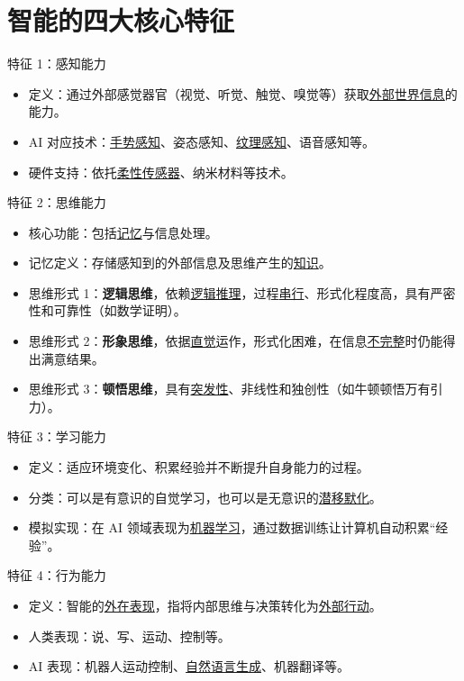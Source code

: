 \documentclass[11pt,a4paper]{ctexrep}
\newcommand{\fillblank}[1]{\underline{\hspace{2em}#1\hspace{2em}}}
\begin{document}
\section{智能的四大核心特征}

\begin{qbox}{特征 1：感知能力}
    \begin{itemize}
        \item 定义：通过外部感觉器官（视觉、听觉、触觉、嗅觉等）获取\fillblank{外部世界信息}的能力。
        \item AI 对应技术：\fillblank{手势感知}、姿态感知、\fillblank{纹理感知}、语音感知等。
        \item 硬件支持：依托\fillblank{柔性传感器}、纳米材料等技术。
    \end{itemize}
\end{qbox}

\begin{qbox}{特征 2：思维能力}
    \begin{itemize}
        \item 核心功能：包括\fillblank{记忆}与信息处理。
        \item 记忆定义：存储感知到的外部信息及思维产生的\fillblank{知识}。
        \item 思维形式 1：\textbf{逻辑思维}，依赖\fillblank{逻辑推理}，过程\fillblank{串行}、形式化程度高，具有严密性和可靠性（如数学证明）。
        \item 思维形式 2：\textbf{形象思维}，依据\fillblank{直觉}运作，形式化困难，在信息\fillblank{不完整}时仍能得出满意结果。
        \item 思维形式 3：\textbf{顿悟思维}，具有\fillblank{突发性}、非线性和独创性（如牛顿顿悟万有引力）。
    \end{itemize}
\end{qbox}

\begin{qbox}{特征 3：学习能力}
    \begin{itemize}
        \item 定义：适应环境变化、积累经验并不断提升自身能力的过程。
        \item 分类：可以是有意识的自觉学习，也可以是无意识的\fillblank{潜移默化}。
        \item 模拟实现：在 AI 领域表现为\fillblank{机器学习}，通过数据训练让计算机自动积累“经验”。
    \end{itemize}
\end{qbox}

\begin{qbox}{特征 4：行为能力}
    \begin{itemize}
        \item 定义：智能的\fillblank{外在表现}，指将内部思维与决策转化为\fillblank{外部行动}。
        \item 人类表现：说、写、运动、控制等。
        \item AI 表现：机器人运动控制、\fillblank{自然语言生成}、机器翻译等。
    \end{itemize}
\end{qbox}
\end{document}
